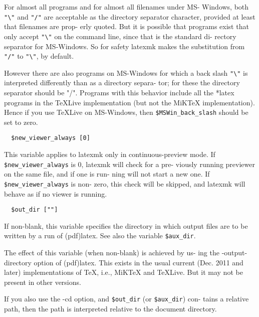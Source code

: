 For almost all programs and for almost all filenames  under  MS-
Windows,  both  \verb|"\"|  and  \verb|"/"|  are  acceptable  as the directory
separator character, provided at least that filenames are  prop-
erly  quoted.   But it is possible that programs exist that only
accept \verb|"\"| on the command line, since that is the  standard  di-
rectory  separator  for MS-Windows.  So for safety latexmk makes
the substitution from \verb|"/"| to \verb|"\"|, by default.

However there are also programs on MS-Windows for which  a  back
slash \verb|"\"| is interpreted differently than as a directory separa-
tor; for these the directory separator should be "/".   Programs
with  this  behavior  include  all  the  *latex  programs in the
TeXLive implementation  (but  not  the  MiKTeX  implementation).
Hence  if  you use TeXLive on MS-Windows, then \verb|$MSWin_back_slash|
should be set to zero.


\begin{verbatim}
  $new_viewer_always [0]
\end{verbatim}

This variable applies  to  latexmk  only  in  continuous-preview
mode.  If \verb|$new_viewer_always| is 0, latexmk will check for a pre-
viously running previewer on the same file, and if one  is  run-
ning  will  not  start a new one.  If \verb|$new_viewer_always| is non-
zero, this check will be skipped, and latexmk will behave as  if
no viewer is running.

\begin{verbatim}
  $out_dir [""]
\end{verbatim}

If  non-blank,  this  variable  specifies the directory in which
output files are to be written by a run of (pdf)latex.  See also
the variable \verb|$aux_dir|.

The  effect of this variable (when non-blank) is achieved by us-
ing the -output-directory option of (pdf)latex.  This exists  in
the  usual current (Dec. 2011 and later) implementations of TeX,
i.e., MiKTeX and TeXLive. But it may not  be  present  in  other
versions.

If  you also use the -cd option, and \verb|$out_dir| (or \verb|$aux_dir|) con-
tains a relative path, then the path is interpreted relative  to
the document directory.

